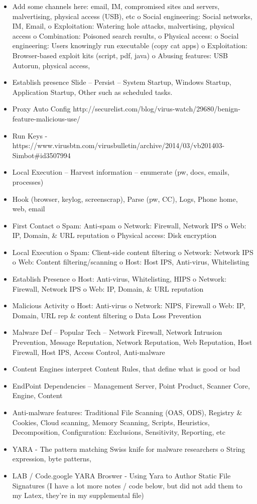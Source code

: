 \documentclass[12pt]{article}
\begin{document}
\begin{itemize}
\item	Add some channels here: email, IM, compromised sites and servers, malvertising, physical access (USB), etc
o	Social engineering: Social networks, IM, Email, 
o	Exploitation: Watering hole attacks, malvertising, physical access
o	Combination: Poisoned search results, 
o	Physical access:
o	Social engineering: Users knowingly run executable (copy cat apps)
o	Exploitation: Browser-based exploit kits (script, pdf, java)
o	Abusing features: USB Autorun, physical access,
\item	Establish presence Slide – Persist – System Startup, Windows Startup, Application Startup, Other such as scheduled tasks.
\item	Proxy Auto Config http://securelist.com/blog/virus-watch/29680/benign-feature-malicious-use/
\item	Run Keys - https://www.virusbtn.com/virusbulletin/archive/2014/03/vb201403-Simbot#id3507994
\item	Local Execution – Harvest information – enumerate (pw, docs, emails, processes)
\item	Hook (browser, keylog, screenscrap), Parse (pw, CC), Logs, Phone home, web, email
\item	First Contact
o	Spam: Anti-spam
o	Network: Firewall, Network IPS
o	Web: IP, Domain, & URL reputation
o	Physical access: Disk encryption
\item	Local Execution
o	Spam: Client-side content filtering
o	Network: Network IPS
o	Web: Content filtering/scanning
o	Host: Host IPS, Anti-virus, Whitelisting
\item	Establish Presence
o	Host: Anti-virus, Whitelisting, HIPS
o	Network: Firewall, Network IPS
o	Web: IP, Domain, & URL reputation
\item	Malicious Activity
o	Host: Anti-virus
o	Network: NIPS, Firewall
o	Web: IP, Domain, URL rep & content filtering
o	Data Loss Prevention
\item	Malware Def – Popular Tech – Network Firewall, Network Intrusion Prevention, Message Reputation, Network Reputation, Web Reputation, Host Firewall, Host IPS, Access Control, Anti-malware
\item	Content Engines interpret Content Rules, that define what is good or bad
\item	EndPoint Dependencies – Management Server, Point Product, Scanner Core, Engine, Content
\item	Anti-malware features: Traditional File Scanning (OAS, ODS), Registry & Cookies, Cloud scanning, Memory Scanning, Scripts, Heuristics, Decomposition, Configuration: Exclusions, Sensitivity, Reporting, etc
\item	YARA - The pattern matching Swiss knife for malware researchers
o	String expression, byte patterns, 
\item	LAB / Code.google YARA Broswer - Using Yara to Author Static File Signatures (I have a lot more notes / code below, but did not add them to my Latex, they're in my supplemental file)

\end{itemize}
\end{document}
